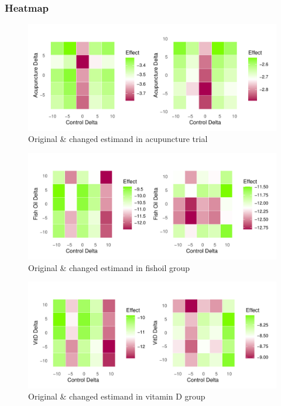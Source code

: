 \documentclass{article}
\newcommand{\pandocbounded}[1]{#1}
\begin{document}
\subsubsection{Heatmap}\label{heatmap}

\begin{figure}
\centering
\pandocbounded{\includegraphics[keepaspectratio]{Final_Report_files/figure-latex/unnamed-chunk-35-1.pdf}}
\caption{Original \& changed estimand in acupuncture trial}
\end{figure}

\begin{figure}
\centering
\pandocbounded{\includegraphics[keepaspectratio]{Final_Report_files/figure-latex/unnamed-chunk-36-1.pdf}}
\caption{Original \& changed estimand in fishoil group}
\end{figure}

\begin{figure}
\centering
\pandocbounded{\includegraphics[keepaspectratio]{Final_Report_files/figure-latex/unnamed-chunk-37-1.pdf}}
\caption{Original \& changed estimand in vitamin D group}
\end{figure}
\end{document}
